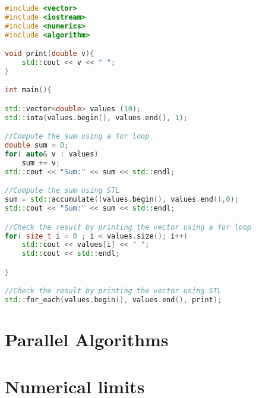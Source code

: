 \begin{lstlisting}[language=c++,caption={Example for a function definition to compute the maximum of two numbers.\label{code:algorithms:showcase}},float,floatplacement=tb]
#include <vector> 
#include <iostream>
#include <numerics>
#include <algorithm>

void print(double v){
	std::cout << v << " ";
}

int main(){

std::vector<double> values (10);
std::iota(values.begin(), values.end(), 1);

//Compute the sum using a for loop
double sum = 0;
for( auto& v : values)
	sum += v;
std::cout << "Sum:" << sum << std::endl;

//Compute the sum using STL 
sum = std::accumulate((values.begin(), values.end(),0);
std::cout << "Sum:" << sum << std::endl;

//Check the result by printing the vector using a for loop
for( size_t i = 0 ; i < values.size(); i++)
	std::cout << values[i] << " ";
	std::cout << std::endl;

}

//Check the result by printing the vector using STL
std::for_each(values.begin(), values.end(), print);
\end{lstlisting}



\section{Parallel Algorithms}




\section{Numerical limits}


\theendnotes
